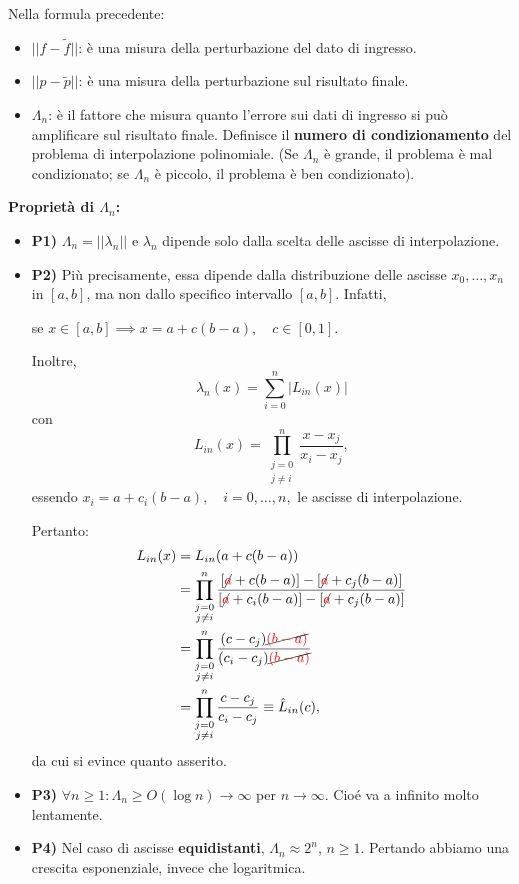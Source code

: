     \vspace{0.5cm}
    Nella formula precedente:
    \begin{itemize}
        \item $||f - \tilde{f}||$: è una misura della perturbazione del dato di ingresso.
        \item $||p - \tilde{p}||$: è una misura della perturbazione sul risultato finale.
        \item $\Lambda_n$: è il fattore che misura quanto l'errore sui dati di ingresso si può amplificare sul risultato finale. Definisce il \textbf{numero di condizionamento} del problema di interpolazione polinomiale. (Se $\Lambda_n$ è grande, il problema è mal condizionato; se $\Lambda_n$ è piccolo, il problema è ben condizionato).
    \end{itemize}
    
    \textbf{Proprietà di $\Lambda_n$:}
    \begin{itemize}
        \item \textbf{P1)} $\Lambda_n = ||\lambda_n||$ e $\lambda_n$ dipende solo dalla scelta delle ascisse di interpolazione.
        \item \textbf{P2)} Più precisamente, essa dipende dalla distribuzione delle ascisse $x_0, \dots, x_n$ in $[a,b]$, ma non dallo specifico intervallo $[a,b]$. Infatti,

    se $x \in [a,b] \implies x = a + c(b-a), \quad c \in [0,1]$.

    Inoltre,
    $$ \lambda_n(x) = \sum_{i=0}^{n} |L_{in}(x)| $$
    con
    $$ L_{in}(x) = \prod_{\substack{j=0 \\ j \neq i}}^{n} \frac{x - x_j}{x_i - x_j}, $$
    essendo $x_i = a + c_i(b-a), \quad i=0, \dots, n,$
    le ascisse di interpolazione.
    
    Pertanto:
    \begin{align*}
        L_{in}(x) &= L_{in}(a + c(b-a)) \\
        &= \prod_{\substack{j=0 \\ j \neq i}}^{n} \frac{[\cancel{\textcolor{red}{a}} + c(b-a)] - [\cancel{\textcolor{red}{a}} + c_j(b-a)]}{[\cancel{\textcolor{red}{a}} + c_i(b-a)] - [\cancel{\textcolor{red}{a}} + c_j(b-a)]} \\
        &= \prod_{\substack{j=0 \\ j \neq i}}^{n} \frac{(c - c_j)\cancel{\textcolor{red}{(b-a)}}}{(c_i - c_j)\cancel{\textcolor{red}{(b-a)}}} \\
        &= \prod_{\substack{j=0 \\ j \neq i}}^{n} \frac{c - c_j}{c_i - c_j} \equiv \hat{L}_{in}(c),
    \end{align*}
    da cui si evince quanto asserito.
        \item \textbf{P3)} $\forall n \ge 1 : \Lambda_n \ge O(\log n) \to \infty$ per $n \to \infty$. Cioé va a infinito molto lentamente.
        \item \textbf{P4)} Nel caso di ascisse \textbf{equidistanti}, $\Lambda_n \approx 2^n$, $n \ge 1$. Pertando abbiamo una crescita esponenziale, invece che logaritmica.
    \end{itemize}

